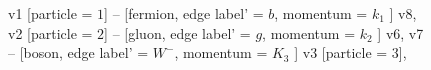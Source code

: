 \documentclass{revtex4}
\begin{document}
\begin{figure}[!htb]
\begin{center}
{    %
v1 [particle = \(1\)] -- [fermion, edge label' = \(b\), momentum = \(k_{1}\) ] v8, 
v2 [particle = \(2\)] -- [gluon, edge label' = \(g\), momentum = \(k_{2}\) ] v6, 
v7 -- [boson, edge label' = \(W^{-}\), momentum = \(K_{3}\) ] v3 [particle = \(3\)], 
}
\end{center}
\end{figure}
\end{document}
